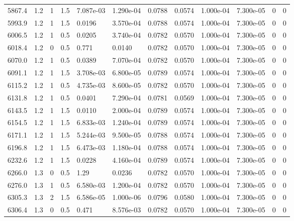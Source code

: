 \documentclass[preview]{standalone}
\begin{document}
{{{\begin{tabular}{L{1.2cm}C{1.2cm} C{0.3cm}C{0.5cm} C{1.4cm}C{1.4cm} C{1.4cm}C{1.4cm} C{1.6cm}C{1.6cm} C{1.6cm}C{1.6cm}}
  5867.4  &   1.2  & 1     & 1.5 &  7.087e-03  & 1.290e-04  &  0.0788&   0.0574& 1.000e-04 & 7.300e-05   &  0 & 0  \\ 
  5993.9  &   1.2  & 1     & 1.5 &  0.0196  & 3.570e-04  &  0.0788&   0.0574& 1.000e-04 & 7.300e-05   &  0 & 0  \\ 
  6006.5  &   1.2  & 1     & 0.5 &  0.0205  & 3.740e-04  &  0.0782&   0.0570& 1.000e-04 & 7.300e-05   &  0 & 0  \\ 
  6018.4  &   1.2  & 0     & 0.5 &  0.771  & 0.0140  &  0.0782&   0.0570& 1.000e-04 & 7.300e-05   &  0 & 0  \\ 
  6070.0  &   1.2  & 1     & 0.5 &  0.0389  & 7.070e-04  &  0.0782&   0.0570& 1.000e-04 & 7.300e-05   &  0 & 0  \\ 
  6091.1  &   1.2  & 1     & 1.5 &  3.708e-03  & 6.800e-05  &  0.0789&   0.0574& 1.000e-04 & 7.300e-05   &  0 & 0  \\ 
  6115.2  &   1.2  & 1     & 0.5 &  4.735e-03  & 8.600e-05  &  0.0782&   0.0570& 1.000e-04 & 7.300e-05   &  0 & 0  \\ 
  6131.8  &   1.2  & 1     & 0.5 &  0.0401  & 7.290e-04  &  0.0781&   0.0569& 1.000e-04 & 7.300e-05   &  0 & 0  \\ 
  6143.5  &   1.2  & 1     & 1.5 &  0.0110  & 2.000e-04  &  0.0789&   0.0574& 1.000e-04 & 7.300e-05   &  0 & 0  \\ 
  6154.5  &   1.2  & 1     & 1.5 &  6.833e-03  & 1.240e-04  &  0.0789&   0.0574& 1.000e-04 & 7.300e-05   &  0 & 0  \\ 
  6171.1  &   1.2  & 1     & 1.5 &  5.244e-03  & 9.500e-05  &  0.0788&   0.0574& 1.000e-04 & 7.300e-05   &  0 & 0  \\ 
  6196.8  &   1.2  & 1     & 1.5 &  6.473e-03  & 1.180e-04  &  0.0788&   0.0574& 1.000e-04 & 7.300e-05   &  0 & 0  \\ 
  6232.6  &   1.2  & 1     & 1.5 &  0.0228  & 4.160e-04  &  0.0789&   0.0574& 1.000e-04 & 7.300e-05   &  0 & 0  \\ 
  6266.0  &   1.3  & 0     & 0.5 &  1.29  & 0.0236  &  0.0782&   0.0570& 1.000e-04 & 7.300e-05   &  0 & 0  \\ 
  6276.0  &   1.3  & 1     & 0.5 &  6.580e-03  & 1.200e-04  &  0.0782&   0.0570& 1.000e-04 & 7.300e-05   &  0 & 0  \\ 
  6305.3  &   1.3  & 2     & 1.5 &  6.586e-05  & 1.000e-06  &  0.0796&   0.0580& 1.000e-04 & 7.300e-05   &  0 & 0  \\ 
  6306.4  &   1.3  & 0     & 0.5 &  0.471  & 8.576e-03  &  0.0782&   0.0570& 1.000e-04 & 7.300e-05   &  0 & 0  \\ 

\end{tabular}}}}
\end{document}
